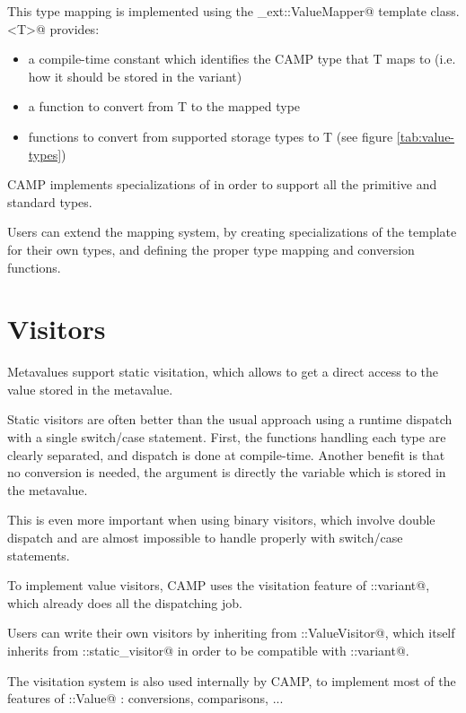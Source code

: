 \documentclass[a4paper, twoside]{report}
\begin{document}
	This type mapping is implemented using the \verb@camp_ext::ValueMapper@ template class.
	@ provides:
	\begin{itemize}
		\item a compile-time constant which identifies the CAMP type that T maps to (i.e. how it should be stored in the variant)
		\item a function to convert from T to the mapped type
		\item functions to convert from supported storage types to T (see figure \ref{tab:value-types})
	\end{itemize}

	CAMP implements specializations of \verb@ValueMapper@ in order to support all the primitive
	and standard types.
	
	Users can extend the mapping system, by creating specializations of the
	\verb@ValueMapper@ template for their own types, and defining the proper type mapping
	and conversion functions.

\section{Visitors}

	Metavalues support static visitation, which allows to get a direct access to the value stored
	in the metavalue.
	
  Static visitors are often better than the usual approach using a runtime dispatch with a single
  switch/case statement. First, the functions handling each type are clearly separated, and dispatch
  is done at compile-time. Another benefit is that no conversion is needed, the argument is directly
  the variable which is stored in the metavalue.
  
  This is even more important when using binary visitors, which involve double dispatch and are almost impossible to
  handle properly with switch/case statements.
	
	To implement value visitors, CAMP uses the visitation feature of
	\verb@boost::variant@, which already does all the dispatching job.
	
	Users can write their own visitors by inheriting from \verb@camp::ValueVisitor@, which
	itself inherits from \verb@boost::static_visitor@ in order to be compatible with \verb@boost::variant@.
	
	The visitation system is also used internally by CAMP, to implement most of the features of
	\verb@camp::Value@ : conversions, comparisons, ...
\end{document}
